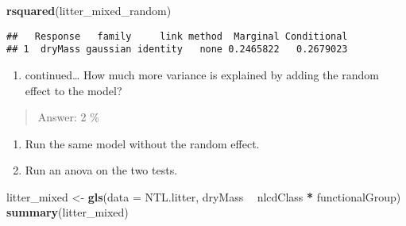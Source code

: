 \documentclass[]{article}
\newenvironment{Shaded}{\begin{snugshade}}{\end{snugshade}}
\newcommand{\DataTypeTok}[1]{\textcolor[rgb]{0.13,0.29,0.53}{#1}}
\newcommand{\KeywordTok}[1]{\textcolor[rgb]{0.13,0.29,0.53}{\textbf{#1}}}
\newcommand{\NormalTok}[1]{#1}
\newcommand{\OperatorTok}[1]{\textcolor[rgb]{0.81,0.36,0.00}{\textbf{#1}}}
\newcommand{\StringTok}[1]{\textcolor[rgb]{0.31,0.60,0.02}{#1}}
\providecommand{\tightlist}{%
  \setlength{\itemsep}{0pt}\setlength{\parskip}{0pt}}
\begin{document}
\begin{Shaded}
\begin{Highlighting}[]
\KeywordTok{rsquared}\NormalTok{(litter_mixed_random)}
\end{Highlighting}
\end{Shaded}

\begin{verbatim}
##   Response   family     link method  Marginal Conditional
## 1  dryMass gaussian identity   none 0.2465822   0.2679023
\end{verbatim}

\begin{enumerate}
\def\labelenumi{\alph{enumi}.}
\setcounter{enumi}{1}
\tightlist
\item
  continued\ldots{} How much more variance is explained by adding the
  random effect to the model?
\end{enumerate}

\begin{quote}
Answer: 2 \%
\end{quote}

\begin{enumerate}
\def\labelenumi{\alph{enumi}.}
\setcounter{enumi}{2}
\tightlist
\item
  Run the same model without the random effect.
\item
  Run an anova on the two tests.
\end{enumerate}

\begin{Shaded}
\begin{Highlighting}[]
\NormalTok{litter_mixed <-}\StringTok{ }\KeywordTok{gls}\NormalTok{(}\DataTypeTok{data =}\NormalTok{ NTL.litter,}
\NormalTok{                    dryMass }\OperatorTok{~}\StringTok{ }\NormalTok{nlcdClass }\OperatorTok{*}\StringTok{ }\NormalTok{functionalGroup)}
\KeywordTok{summary}\NormalTok{(litter_mixed)}
\end{Highlighting}
\end{Shaded}
\end{document}
